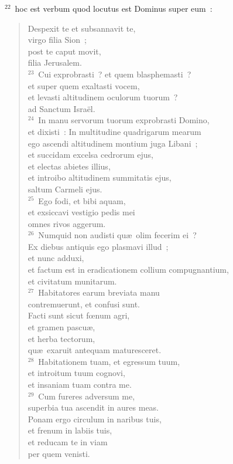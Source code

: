 ${}^{22}$~hoc est verbum quod locutus est Dominus super eum~: \begin{verse}Despexit te et subsannavit te,\\ virgo filia Sion~;\\ post te caput movit,\\ filia Jerusalem.\\
${}^{23}$~Cui exprobrasti~? et quem blasphemasti~?\\ et super quem exaltasti vocem,\\ et levasti altitudinem oculorum tuorum~?\\ ad Sanctum Isra\"el.\\
${}^{24}$~In manu servorum tuorum exprobrasti Domino,\\ et dixisti~: In multitudine quadrigarum mearum\\ ego ascendi altitudinem montium juga Libani~;\\ et succidam excelsa cedrorum ejus,\\ et electas abietes illius,\\ et introibo altitudinem summitatis ejus,\\ saltum Carmeli ejus.\\
${}^{25}$~Ego fodi, et bibi aquam,\\ et exsiccavi vestigio pedis mei\\ omnes rivos aggerum.\\
${}^{26}$~Numquid non audisti qu\ae\ olim fecerim ei~?\\ Ex diebus antiquis ego plasmavi illud~;\\ et nunc adduxi,\\ et factum est in eradicationem collium compugnantium,\\ et civitatum munitarum.\\
${}^{27}$~Habitatores earum breviata manu\\ contremuerunt, et confusi sunt.\\ Facti sunt sicut fœnum agri,\\ et gramen pascu\ae ,\\ et herba tectorum,\\ qu\ae\ exaruit antequam maturesceret.\\
${}^{28}$~Habitationem tuam, et egressum tuum,\\ et introitum tuum cognovi,\\ et insaniam tuam contra me.\\
${}^{29}$~Cum fureres adversum me,\\ superbia tua ascendit in aures meas.\\ Ponam ergo circulum in naribus tuis,\\ et frenum in labiis tuis,\\ et reducam te in viam\\ per quem venisti.\end{verse}


